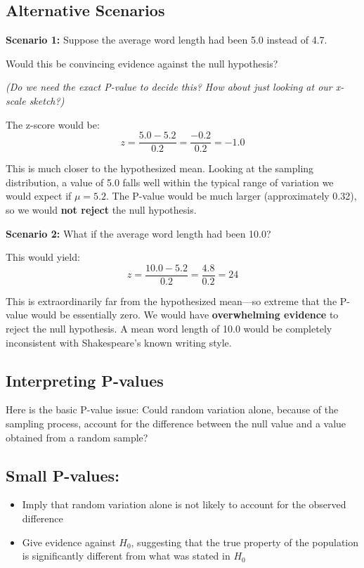 \documentclass[
  letterpaper,
  DIV=11,
  numbers=noendperiod]{scrreprt}
\begin{document}
\subsection{Alternative Scenarios}\label{alternative-scenarios}

\textbf{Scenario 1:} Suppose the average word length had been 5.0
instead of 4.7.

Would this be convincing evidence against the null hypothesis?

\emph{(Do we need the exact P-value to decide this? How about just
looking at our x-scale sketch?)}

The z-score would be: \[
z = \frac{5.0 - 5.2}{0.2} = \frac{-0.2}{0.2} = -1.0
\]

This is much closer to the hypothesized mean. Looking at the sampling
distribution, a value of 5.0 falls well within the typical range of
variation we would expect if \(\mu = 5.2\). The P-value would be much
larger (approximately 0.32), so we would \textbf{not reject} the null
hypothesis.

\textbf{Scenario 2:} What if the average word length had been 10.0?

This would yield: \[
z = \frac{10.0 - 5.2}{0.2} = \frac{4.8}{0.2} = 24
\]

This is extraordinarily far from the hypothesized mean---so extreme that
the P-value would be essentially zero. We would have
\textbf{overwhelming evidence} to reject the null hypothesis. A mean
word length of 10.0 would be completely inconsistent with Shakespeare's
known writing style.

\subsection{Interpreting P-values}\label{interpreting-p-values}

Here is the basic P-value issue: Could random variation alone, because
of the sampling process, account for the difference between the null
value and a value obtained from a random sample?

\subsection{Small P-values:}\label{small-p-values}

\begin{itemize}
\item
  Imply that random variation alone is not likely to account for the
  observed difference
\item
  Give evidence against \(H_0\), suggesting that the true property of
  the population is significantly different from what was stated in
  \(H_0\)
\end{itemize}
\end{document}
